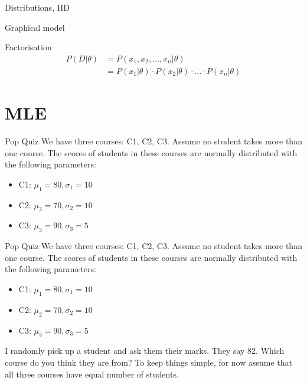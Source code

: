 \documentclass[handout]{beamer}
\begin{document}
\begin{section}{Distributions, IID}
\begin{frame}{Graphical model}
        
    \end{frame}

    \begin{frame}{Factorisation}
        \begin{align*}
            P(D|\theta) & = P(x_1, x_2, \ldots, x_n | \theta) \\
            & = P(x_1|\theta) \cdot P(x_2|\theta) \cdot \ldots \cdot P(x_n|\theta)
        \end{align*}
        
    \end{frame}

\end{section}

\section{MLE}
\begin{frame}{Pop Quiz}
    We have three courses: C1, C2, C3. Assume no student takes more than one course.
    The scores of students in these courses are normally distributed with the following parameters:
    \begin{itemize}
        \item C1: $\mu_1 = 80, \sigma_1 = 10$
        \item C2: $\mu_2 = 70, \sigma_2 = 10$
        \item C3: $\mu_3 = 90, \sigma_3 = 5$
    \end{itemize}


    
\end{frame}

\begin{frame}{Pop Quiz}
    We have three courses: C1, C2, C3. Assume no student takes more than one course.
    The scores of students in these courses are normally distributed with the following parameters:
    \begin{itemize}
        \item C1: $\mu_1 = 80, \sigma_1 = 10$
        \item C2: $\mu_2 = 70, \sigma_2 = 10$
        \item C3: $\mu_3 = 90, \sigma_3 = 5$
    \end{itemize}

   
    I randomly pick up a student and ask them their marks. They say 82. Which course do you think they are from?
    To keep things simple, for now assume that all three courses have equal number of students.
    
    
    
\end{frame}
\end{document}
